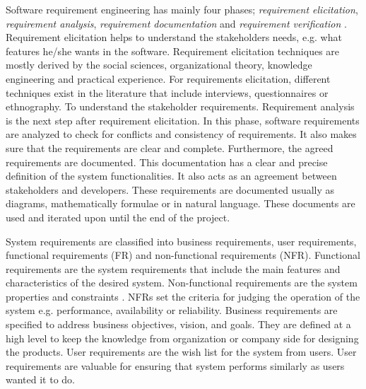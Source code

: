 Software requirement engineering has mainly four phases; \emph{requirement
elicitation}, \emph{requirement analysis}, \emph{requirement documentation} and
\emph{requirement verification} \cite {Kotonya:1998}. Requirement elicitation
\cite{Coughlan:2002, Zowghi2005} helps to understand the
stakeholders needs, e.g. what features he/she wants in the software.
Requirement elicitation techniques are mostly derived by the social sciences,
organizational theory, knowledge engineering and practical experience. For
requirements elicitation, different techniques exist in the literature that
include interviews, questionnaires or ethnography. To understand the
stakeholder requirements.
Requirement analysis \cite{Nuseibeh:2000} is the next step
after requirement elicitation. In this phase, software requirements are analyzed
to check for conflicts and consistency of requirements. It also makes sure
that the requirements are clear and complete.
Furthermore, the agreed requirements are documented. This documentation has a clear and precise
definition of the system functionalities. It also acts as an agreement between
stakeholders and developers. These requirements are documented usually as diagrams, mathematically
formulae or in natural language. These documents are used and iterated upon
until the end of the project.

System requirements are classified into business requirements, user
requirements, functional requirements (FR) and non-functional requirements (NFR). Functional
requirements are the system requirements that include the main features and
characteristics of the desired system. Non-functional requirements are the
system properties and constraints \cite{Davis:1993, Glinz}. NFRs set the
criteria for judging the operation of the system e.g.
performance, availability or reliability. Business requirements are specified to
address business objectives, vision, and goals. They are defined at a high level
to keep the knowledge from organization or company side for designing the products.
User requirements are the wish list for the system from users.
User requirements are valuable for ensuring that system performs similarly as users wanted it to do.

